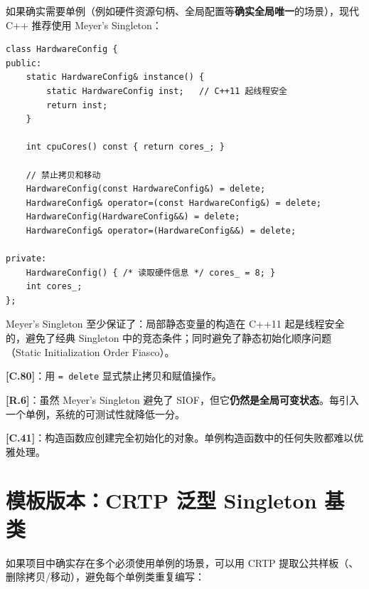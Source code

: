 \documentclass[12pt,a4paper,fontset=fandol]{ctexbook}
\newcommand{\guideref}[1]{\textbf{\textcolor{blue!70!black}{[#1]}}}
\begin{document}
如果确实需要单例（例如硬件资源句柄、全局配置等\textbf{确实全局唯一}的场景），现代 C++ 推荐使用 Meyer's Singleton：

\begin{lstlisting}[style=cppstyle, caption={Meyer's Singleton --- 最小化单例危害}]
class HardwareConfig {
public:
    static HardwareConfig& instance() {
        static HardwareConfig inst;   // C++11 起线程安全
        return inst;
    }

    int cpuCores() const { return cores_; }

    // 禁止拷贝和移动
    HardwareConfig(const HardwareConfig&) = delete;
    HardwareConfig& operator=(const HardwareConfig&) = delete;
    HardwareConfig(HardwareConfig&&) = delete;
    HardwareConfig& operator=(HardwareConfig&&) = delete;

private:
    HardwareConfig() { /* 读取硬件信息 */ cores_ = 8; }
    int cores_;
};
\end{lstlisting}

Meyer's Singleton 至少保证了：局部静态变量的构造在 C++11 起是线程安全的，避免了经典 Singleton 中的竞态条件；同时避免了静态初始化顺序问题（Static Initialization Order Fiasco）。

\begin{guideline}
\guideref{C.80}：用 \texttt{= delete} 显式禁止拷贝和赋值操作。

\guideref{R.6}：虽然 Meyer's Singleton 避免了 SIOF，但它\textbf{仍然是全局可变状态}。每引入一个单例，系统的可测试性就降低一分。

\guideref{C.41}：构造函数应创建完全初始化的对象。单例构造函数中的任何失败都难以优雅处理。
\end{guideline}

\section{模板版本：CRTP 泛型 Singleton 基类}

如果项目中确实存在多个必须使用单例的场景，可以用 CRTP 提取公共样板（\texttt{}、删除拷贝/移动），避免每个单例类重复编写：
\end{document}
